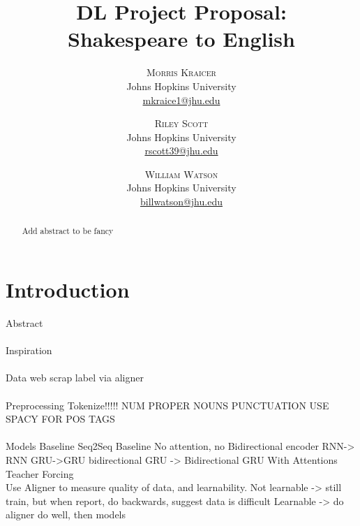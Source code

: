 \documentclass[twoside,twocolumn]{article}
\title{DL Project Proposal:\\Shakespeare to English}
\author{%
\textsc{Morris Kraicer} \\[1ex]
\normalsize Johns Hopkins University \\
\normalsize \href{mailto:mkraice1@jhu.edu}{mkraice1@jhu.edu}
 \and
 \textsc{Riley Scott} \\[1ex]
\normalsize Johns Hopkins University \\
\normalsize \href{mailto:rscott39@jhu.edu}{rscott39@jhu.edu}
 \and
  \textsc{William Watson} \\[1ex]
\normalsize Johns Hopkins University \\
\normalsize \href{mailto:billwatson@jhu.edu}{billwatson@jhu.edu}
}
\date{}%
\begin{document}
\maketitle





\begin{abstract}
\noindent
Add abstract to be fancy
\end{abstract}

\section{Introduction}
\cite{bahdanau2014neural}
\cite{luong2015effective}
\cite{liu2016neural}
\cite{cho2014learning}
\cite{sutskever2014sequence}
\cite{papineni2002bleu}
Abstract
\\\\
Inspiration
\\\\
Data
	web scrap
	label via aligner
\\\\
Preprocessing
	Tokenize!!!!!
		NUM
		PROPER NOUNS
		PUNCTUATION
		USE SPACY FOR POS TAGS
\\\\
Models
	Baseline
		Seq2Seq Baseline
			No attention, no Bidirectional
			encoder RNN-> RNN
		GRU->GRU
		bidirectional GRU -> Bidirectional GRU
		With Attentions
		Teacher Forcing
\\
	Use Aligner to measure quality of data, and learnability.
		Not learnable -> still train, but when report, do backwards, suggest data is difficult
		Learnable -> do aligner do well, then models
\end{document}
